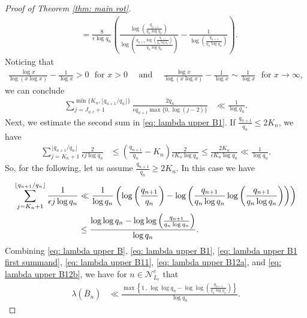 \documentclass[11pt]{amsart}
\theoremstyle{definition}
\numberwithin{equation}{section}
\begin{document}
\begin{proof}[Proof of Theorem \ref{thm: main rot}]
\begin{align*}
  &=\frac{8 }{\epsilon \log q_n}\left( \frac{\log\left( \frac{q_{n+1}}{q_n\log q_n}\right)}{ \log \left( \frac{q_{n+1}\log\left( \frac{q_{n+1}}{q_n\log q_n}\right)}{q_n\log q_n }\right)}
  - 
 \frac{1}{  \log \left( \frac{q_{n+1}}{q_n\log q_n}\right)}\right).
 \end{align*}
Noticing that 
\begin{align*}
 \frac{\log x}{ \log \left( x \log x\right)}
  - 
 \frac{1}{  \log x}>0\,\, \text{ for }x>0\quad\text{ and } \quad\frac{\log x}{ \log \left( x \log x\right)}
  - 
 \frac{1}{  \log x}\sim \frac{1}{\log x}\,\,\text{ for }x\to\infty,
\end{align*}
we can conclude 
 \begin{align}
\sum_{j=J_{n,\epsilon}+1}^{\min\{K_n, \lfloor q_{n+1}/q_n\rfloor\}} \frac{2 q_n}{\epsilon q_{n+1}  \max\{0,\log(j-2)\}}
 &\ll \frac{1}{\log q_n}.\label{eq: lambda upper B11}
\end{align}
Next, we estimate the second sum in \eqref{eq: lambda upper B1}.
If $\frac{q_{n+1}}{q_n}\leq 2 K_n$, we have 
\begin{align}
 \sum_{j=K_n+1}^{\lfloor q_{n+1}/q_n\rfloor}
 \frac{2}{\epsilon j \log q_n}
 &\leq \left(\frac{q_{n+1}}{q_n}-K_n\right)\frac{2}{\epsilon K_n \log q_n}
 \leq \frac{2 K_n}{\epsilon K_n \log q_n}
 \ll \frac{1}{\log q_n}. \label{eq: lambda upper B12a}
\end{align}
So, for the following, let us assume $\frac{q_{n+1}}{q_n}\geq 2 K_n$. In this case we have 
\begin{align}
 \sum_{j=K_n+1}^{\lfloor q_{n+1}/q_n\rfloor}
 \frac{1}{\epsilon j \log q_n}
 &\ll \frac{1}{\log q_n}\left( \log \left(\frac{ q_{n+1}}{q_n}\right)-
 \log \left( \frac{q_{n+1}}{q_n\log q_n}\log\left( \frac{q_{n+1}}{q_n\log q_n}\right)\right)\right)\notag\\
 &\leq \frac{\log\log q_n -\log\log \left(\frac{q_{n+1}}{q_n\log q_n}\right) }{\log q_n}.\label{eq: lambda upper B12b}
\end{align}
Combining \eqref{eq: lambda upper B}, \eqref{eq: lambda upper B1}, \eqref{eq: lambda upper B1 first summand}, \eqref{eq: lambda upper B11}, \eqref{eq: lambda upper B12a}, and \eqref{eq: lambda upper B12b}, 
we have for $n\in \mathcal{N}_{L_{\epsilon}}^c$ that
\begin{align}
 \lambda\left(\overline{B}_n\right)
 &\ll \frac{\max\left\{1\, ,\, \log\log q_n -\log\log \left(\frac{q_{n+1}}{q_n\log q_n}\right) \right\}}{\log q_n}.\label{eq: lambda upper B c}
\end{align}



\end{proof}
\end{document}
